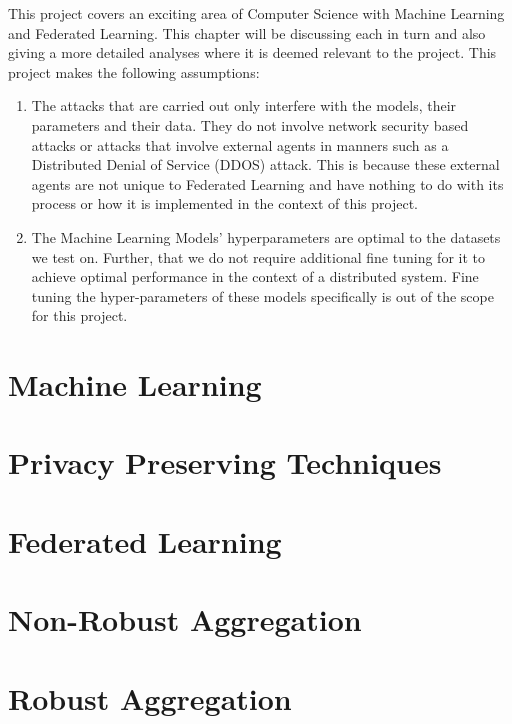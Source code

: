 This project covers an exciting area of Computer Science with Machine Learning and Federated Learning.
This chapter will be discussing each in turn and also giving a more detailed analyses where it is deemed relevant to the project.
This project makes the following assumptions:

\begin{enumerate}
    \item The attacks that are carried out only interfere with the models, their parameters and their data. They do not involve network security based attacks or attacks that involve external agents in manners such as a Distributed Denial of Service (DDOS) attack.
    This is because these external agents are not unique to Federated Learning and have nothing to do with its process or how it is implemented in the context of this project.
    
    \item The Machine Learning Models' hyperparameters are optimal to the datasets we test on. Further, that we do not require additional fine tuning for it to achieve optimal performance in the context of a distributed system. Fine tuning the hyper-parameters of these models specifically is out of the scope for this project.
\end{enumerate}


\section{Machine Learning}




\section{Privacy Preserving Techniques}




\section{Federated Learning}




\section{Non-Robust Aggregation}




\section{Robust Aggregation}



